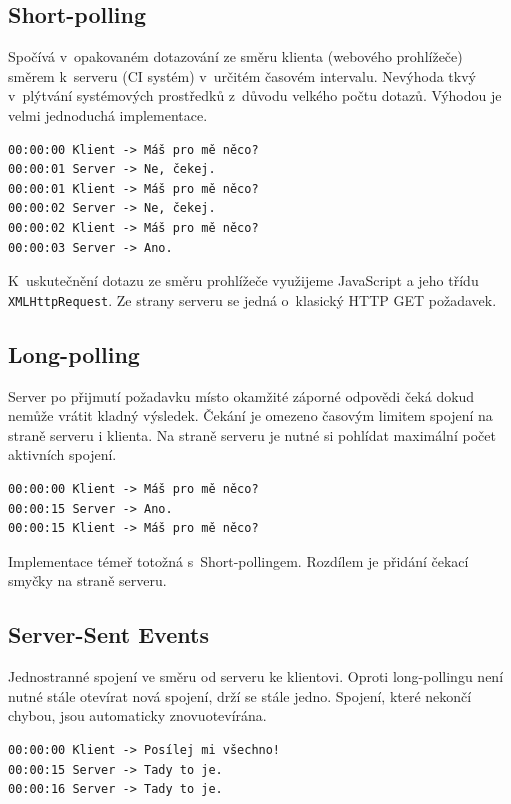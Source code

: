 \subsection{Short-polling}

Spočívá v~opakovaném dotazování ze směru klienta (webového prohlížeče) směrem k~serveru (CI systém) v~určitém časovém intervalu.
Nevýhoda tkvý v~plýtvání systémových prostředků z~důvodu velkého počtu dotazů.
Výhodou je velmi jednoduchá implementace.

\begin{verbatim}
00:00:00 Klient -> Máš pro mě něco?
00:00:01 Server -> Ne, čekej.
00:00:01 Klient -> Máš pro mě něco?
00:00:02 Server -> Ne, čekej.
00:00:02 Klient -> Máš pro mě něco?
00:00:03 Server -> Ano.
\end{verbatim}

K~uskutečnění dotazu ze směru prohlížeče využijeme JavaScript a jeho třídu \verb|XMLHttpRequest|.
Ze strany serveru se jedná o~klasický HTTP GET požadavek.

\subsection{Long-polling}

Server po přijmutí požadavku místo okamžité záporné odpovědi čeká dokud nemůže vrátit kladný výsledek.
Čekání je omezeno časovým limitem spojení na straně serveru i klienta.
Na straně serveru je nutné si pohlídat maximální počet aktivních spojení.

\begin{verbatim}
00:00:00 Klient -> Máš pro mě něco?
00:00:15 Server -> Ano.
00:00:15 Klient -> Máš pro mě něco?
\end{verbatim}

Implementace témeř totožná s~Short-pollingem.
Rozdílem je přidání čekací smyčky na straně serveru.

\subsection{Server-Sent Events}

Jednostranné spojení ve směru od serveru ke klientovi.
Oproti long-pollingu není nutné stále otevírat nová spojení, drží se stále jedno.
Spojení, které nekončí chybou, jsou automaticky znovuotevírána.

\begin{verbatim}
00:00:00 Klient -> Posílej mi všechno!
00:00:15 Server -> Tady to je.
00:00:16 Server -> Tady to je.
\end{verbatim}

